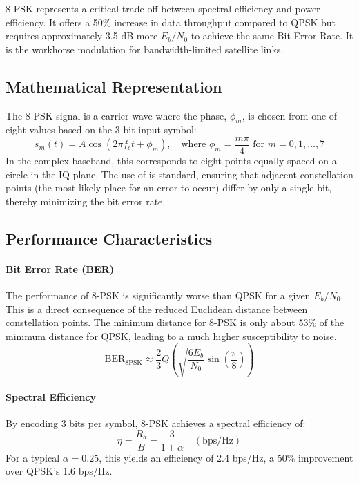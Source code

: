 \begin{keyconcept}
    8-PSK represents a critical trade-off between spectral efficiency and power efficiency. It offers a 50\% increase in data throughput compared to QPSK but requires approximately 3.5 dB more $E_b/N_0$ to achieve the same Bit Error Rate. It is the workhorse modulation for bandwidth-limited satellite links.
\end{keyconcept}


\subsection{Mathematical Representation}

The 8-PSK signal is a carrier wave where the phase, $\phi_m$, is chosen from one of eight values based on the 3-bit input symbol:
\begin{equation}
    s_m(t) = A\cos(2\pi f_c t + \phi_m), \quad \text{where } \phi_m = \frac{m\pi}{4} \text{ for } m = 0, 1, \dots, 7
\end{equation}
In the complex baseband, this corresponds to eight points equally spaced on a circle in the IQ plane. The use of  is standard, ensuring that adjacent constellation points (the most likely place for an error to occur) differ by only a single bit, thereby minimizing the bit error rate.


\subsection{Performance Characteristics}

\paragraph{Bit Error Rate (BER)}
The performance of 8-PSK is significantly worse than QPSK for a given $E_b/N_0$. This is a direct consequence of the reduced Euclidean distance between constellation points. The minimum distance for 8-PSK is only about 53\% of the minimum distance for QPSK, leading to a much higher susceptibility to noise.
\begin{equation}
    \text{BER}_{8\text{PSK}} \approx \frac{2}{3}Q\left(\sqrt{\frac{6E_b}{N_0}} \sin\left(\frac{\pi}{8}\right)\right)
\end{equation}

\paragraph{Spectral Efficiency}
By encoding 3 bits per symbol, 8-PSK achieves a spectral efficiency of:
\begin{equation}
    \eta = \frac{R_b}{B} = \frac{3}{1+\alpha} \quad (\text{bps/Hz})
\end{equation}
For a typical $\alpha=0.25$, this yields an efficiency of 2.4 bps/Hz, a 50\% improvement over QPSK's 1.6 bps/Hz.

